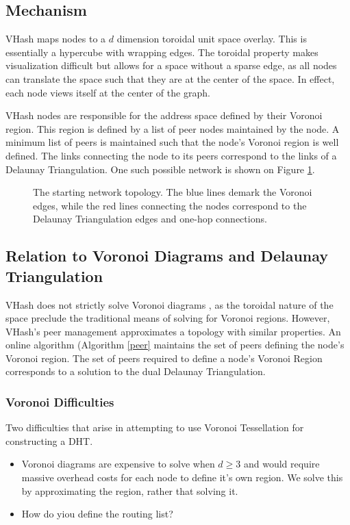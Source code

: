 \documentclass{IEEEtran}
\begin{document}
\subsection{Mechanism}
VHash maps nodes to a $d$ dimension toroidal unit space overlay. This is essentially a hypercube with wrapping edges. The toroidal property makes visualization difficult but allows for a space without a sparse edge, as all nodes can translate the space such that they are at the center of the space.  In effect, each node views itself at the center of the graph.

VHash nodes are responsible for the address space defined by their Voronoi region. This region is defined by a list of peer nodes maintained by the node. A minimum list of peers is maintained such that the node's Voronoi region is well defined. The links connecting the node to its peers correspond to the links of a Delaunay Triangulation.  One such possible network is shown on Figure \ref{churninit}.


\begin{figure}
    \caption{The starting network topology.  The blue lines demark the Voronoi edges, while the red lines connecting the nodes correspond to the Delaunay Triangulation edges and one-hop connections.}
    \label{churninit}
\end{figure}

\subsection{Relation to Voronoi Diagrams and Delaunay Triangulation}

VHash does not strictly solve Voronoi diagrams \cite{voronoi}, as the toroidal nature of the space preclude the traditional means of solving for Voronoi regions. However, VHash's peer management approximates a topology with similar properties. 
An online algorithm (Algorithm \ref{peer} maintains the set of peers defining the node's Voronoi region. The set of peers required to define a node's Voronoi Region corresponds to a solution to the dual Delaunay Triangulation.
\subsubsection{Voronoi Difficulties}
Two difficulties that arise in attempting to use Voronoi Tessellation for constructing a DHT.
\begin{itemize}
	\item Voronoi diagrams are expensive to solve when $d \geq 3$ and would require massive overhead costs for each node to define it's own region.  We solve this by approximating the region, rather that solving it.
	\item How do yiou define the routing list?
\end{itemize}
\end{document}
